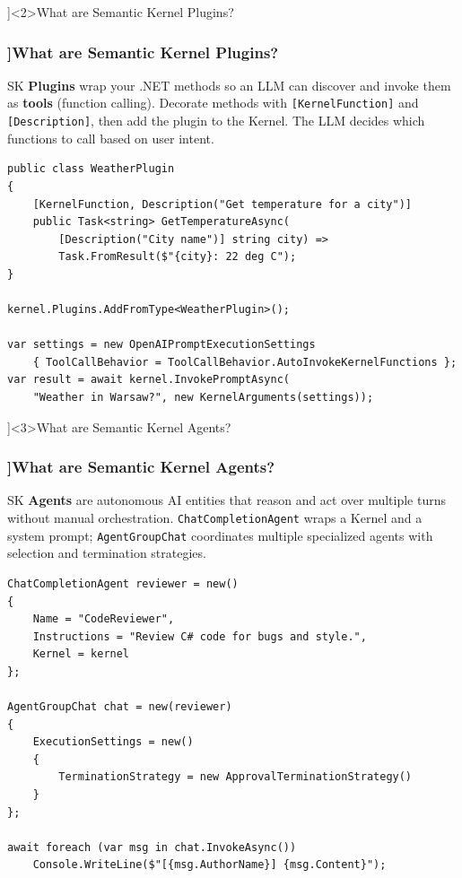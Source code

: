 \QuestionSlide[\CategoryBadge[AIColor!20]{AI \& .NET}]<2>{What are Semantic Kernel Plugins?}

\begin{frame}[fragile]
  \frametitle{\AnswerTitle[\CategoryBadge[AIColor!20]{AI \& .NET}]{What are Semantic Kernel Plugins?}}

  {\footnotesize
  SK \textbf{Plugins} wrap your .NET methods so an LLM can discover and invoke them as \textbf{tools}
  (function calling). Decorate methods with \texttt{[KernelFunction]} and \texttt{[Description]},
  then add the plugin to the Kernel. The LLM decides which functions to call based on user intent.
  }

  \begin{verbatim}
public class WeatherPlugin
{
    [KernelFunction, Description("Get temperature for a city")]
    public Task<string> GetTemperatureAsync(
        [Description("City name")] string city) =>
        Task.FromResult($"{city}: 22 deg C");
}

kernel.Plugins.AddFromType<WeatherPlugin>();

var settings = new OpenAIPromptExecutionSettings
    { ToolCallBehavior = ToolCallBehavior.AutoInvokeKernelFunctions };
var result = await kernel.InvokePromptAsync(
    "Weather in Warsaw?", new KernelArguments(settings));
  \end{verbatim}
\end{frame}

\QuestionSlide[\CategoryBadge[AIColor!20]{AI \& .NET}]<3>{What are Semantic Kernel Agents?}

\begin{frame}[fragile]
  \frametitle{\AnswerTitle[\CategoryBadge[AIColor!20]{AI \& .NET}]{What are Semantic Kernel Agents?}}

  {\footnotesize
  SK \textbf{Agents} are autonomous AI entities that reason and act over multiple turns without manual
  orchestration. \texttt{ChatCompletionAgent} wraps a Kernel and a system prompt; \texttt{AgentGroupChat}
  coordinates multiple specialized agents with selection and termination strategies.
  }

  \begin{verbatim}
ChatCompletionAgent reviewer = new()
{
    Name = "CodeReviewer",
    Instructions = "Review C# code for bugs and style.",
    Kernel = kernel
};

AgentGroupChat chat = new(reviewer)
{
    ExecutionSettings = new()
    {
        TerminationStrategy = new ApprovalTerminationStrategy()
    }
};

await foreach (var msg in chat.InvokeAsync())
    Console.WriteLine($"[{msg.AuthorName}] {msg.Content}");
  \end{verbatim}
\end{frame}

